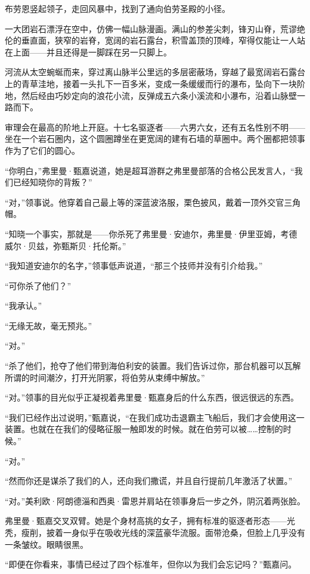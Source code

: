 \documentclass[AutoFakeBold=true]{book}
\begin{document}
布劳恩竖起领子，走回风暴中，找到了通向伯劳圣殿的小径。

\vspace*{1em}

一大团岩石漂浮在空中，仿佛一幅山脉漫画。满山的参差尖刺，锋刃山脊，荒谬绝伦的垂直面，狭窄的岩脊，宽阔的岩石露台，积雪盖顶的顶峰，窄得仅能让一人站在上面——并且还得是一脚踩在另一只脚上。

河流从太空蜿蜒而来，穿过离山脉半公里远的多层密蔽场，穿越了最宽阔岩石露台上的青草洼地，接着一头扎下一百多米，变成一条缓缓而行的瀑布，坠向下一块阶地，然后经由巧妙定向的浪花小流，反弹成五六条小溪流和小瀑布，沿着山脉壁一路而下。

审理会在最高的阶地上开庭。十七名驱逐者——六男六女，还有五名性别不明——坐在一个岩石圈内，这个圆圈蹲坐在更宽阔的建有石墙的草圈中。两个圈都把领事作为了它们的圆心。

``你明白，''弗里曼·甄嘉说道，她是超耳游群之弗里曼部落的合格公民发言人，``我们已经知晓你的背叛？''

``对，''领事说。他穿着自己最上等的深蓝波洛服，栗色披风，戴着一顶外交官三角帽。

``知晓一个事实，那就是——你杀死了弗里曼·安迪尔，弗里曼·伊里亚姆，考德威尔·贝兹，弥甄斯贝·托伦斯。''

``我知道安迪尔的名字，''领事低声说道，``那三个技师并没有引介给我。''

``可你杀了他们？''

``我承认。''

``无缘无故，毫无预兆。''

``对。''

``杀了他们，抢夺了他们带到海伯利安的装置。我们告诉过你，那台机器可以瓦解所谓的时间潮汐，打开光阴冢，将伯劳从束缚中解放。''

``对。''领事的目光似乎正凝视着弗里曼·甄嘉身后的什么东西，很远很远的东西。

``我们已经作出过说明，''甄嘉说，``在我们成功击退霸主飞船后，我们才会使用这一装置。也就在在我们的侵略征服一触即发的时候。就在伯劳可以被……控制的时候。''

``对。''

``然而你还是谋杀了我们的人，还向我们撒谎，并且自行提前几年激活了状置。''

``对。''美利欧·阿朗德淄和西奥·雷恩并肩站在领事身后一步之外，阴沉着两张脸。

弗里曼·甄嘉交叉双臂。她是个身材高挑的女子，拥有标准的驱逐者形态——光秃，瘦削，披着一身似乎在吸收光线的深蓝豪华流服。面带沧桑，但脸上几乎没有一条皱纹。眼睛很黑。

``即便在你看来，事情已经过了四个标准年，但你以为我们会忘记吗？''甄嘉问。
\end{document}
